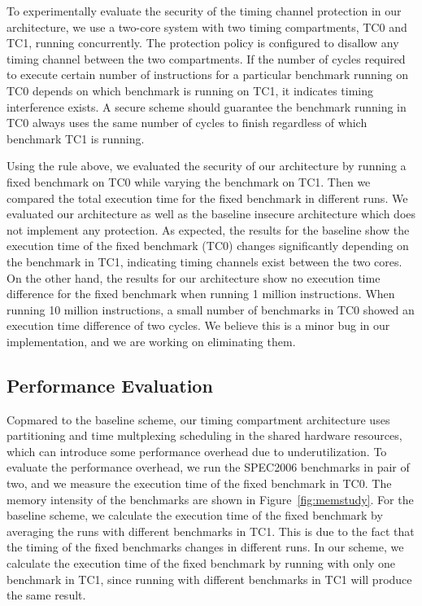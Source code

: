 To experimentally evaluate the security of the timing channel protection in our architecture,
we use a two-core system with two timing compartments, TC0 and TC1, running
concurrently. The protection policy is configured to disallow any timing channel between
the two compartments.
If the number of cycles required to execute certain number of instructions 
for a particular benchmark running on TC0 depends on which benchmark is running on 
TC1, it indicates timing interference exists.%
A secure scheme should guarantee the benchmark running in TC0 always uses the same number of cycles
to finish regardless of which benchmark TC1 is running. 

Using the rule above, we evaluated the security of our architecture by running a fixed benchmark
on TC0 while varying the benchmark on TC1. Then we compared the total execution time for the fixed
benchmark in different runs. We evaluated our architecture as well as the baseline insecure architecture 
which does not implement any protection. As expected, the results for
the baseline show the execution time of the fixed benchmark (TC0) changes significantly depending on 
the benchmark in TC1, indicating timing channels exist between the two cores. On the other hand,
the results for our architecture show no execution time difference for the fixed benchmark when
running 1 million instructions. 
When running 10 million instructions, a small number of benchmarks in TC0
showed an execution time difference of two cycles. We believe this is a minor bug in our
implementation, and we are working on eliminating them.

\subsection{Performance Evaluation}
Copmared to the baseline scheme, our timing compartment architecture uses partitioning and time multplexing
scheduling in the shared hardware resources, which can introduce some performance overhead due to
underutilization. To evaluate the performance overhead, we run the SPEC2006 benchmarks in pair of two, and
we measure the execution time of the fixed benchmark in TC0. The memory intensity of the benchmarks are shown
in Figure~\ref{fig:memstudy}. For the baseline scheme, we calculate the execution time of the fixed benchmark
by averaging the runs with different benchmarks in TC1. This is due to the fact that the timing of the fixed
benchmarks changes in different runs. In our scheme, we calculate the execution time of the fixed benchmark by
running with only one benchmark in TC1, since running with different benchmarks in TC1 will produce the same
result.

